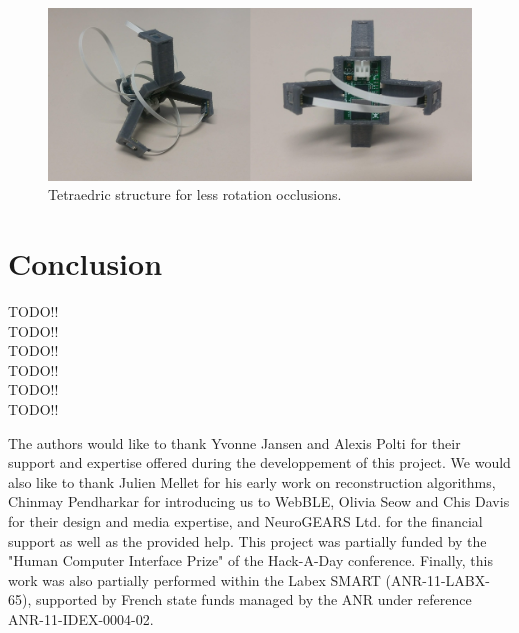 \documentclass[sigchi]{acmart}
\begin{document}
\begin{figure}[h]
  \centering
  \includegraphics[width=\linewidth]{Figures/tetraedric_structure.jpg}
  \caption{Tetraedric structure for less rotation occlusions.}
  \label{Fig:tetraedric_structure}
\end{figure}

\section{Conclusion}

TODO!! \\
TODO!! \\
TODO!! \\
TODO!! \\
TODO!! \\
TODO!! \\


\begin{acks}
The authors would like to thank Yvonne Jansen and Alexis Polti for their support and expertise offered during the developpement of this project. We would also like to thank Julien Mellet for his early work on reconstruction algorithms, Chinmay Pendharkar for introducing us to WebBLE, Olivia Seow and Chis Davis for their design and media expertise, and NeuroGEARS Ltd. for the financial support as well as the provided help. This project was partially funded by the "Human Computer Interface Prize" of the Hack-A-Day conference. Finally, this work was also partially performed within the Labex SMART (ANR-11-LABX-65), supported by French state funds managed by the ANR under reference ANR-11-IDEX-0004-02.
\end{acks}




\end{document}

